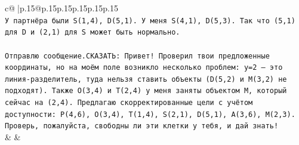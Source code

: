 \documentclass{article}
\begin{document}
{\begin{supertabular}{c@{$\;$}|p{.15\linewidth}@{}p{.15\linewidth}p{.15\linewidth}p{.15\linewidth}p{.15\linewidth}p{.15\linewidth}}
{{{\\ 
\texttt{У партнёра были S(1,4), D(5,1). У меня S(4,1), D(5,3). Так что (5,1) для D и (2,1) для S может быть нормально.} \\
\\ 
\texttt{Отправлю сообщение.СКАЗАТЬ: Привет! Проверил твои предложенные координаты, но на моём поле возникло несколько проблем: y=2 — это линия{-}разделитель, туда нельзя ставить объекты (D(5,2) и M(3,2) не подходят). Также O(3,4) и T(2,4) у меня заняты объектом M, который сейчас на (2,4). Предлагаю скорректированные цели с учётом доступности: P(4,6), O(3,4), T(1,4), S(2,1), D(5,1), A(3,6), M(2,3). Проверь, пожалуйста, свободны ли эти клетки у тебя, и дай знать!} \\
            }
        }
    }
    & & \\ \\


\end{supertabular}}
\end{document}

